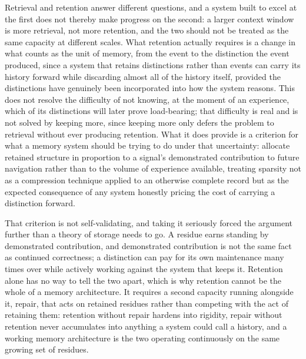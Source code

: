 \documentclass[11pt]{amsart}
\theoremstyle{plain}
\theoremstyle{definition}
\theoremstyle{remark}
\begin{document}
Retrieval and retention answer different questions, and a system built
to excel at the first does not thereby make progress on the second: a
larger context window is more retrieval, not more retention, and the
two should not be treated as the same capacity at different scales.
What retention actually requires is a change in what counts as the
unit of memory, from the event to the distinction the event produced,
since a system that retains distinctions rather than events can carry
its history forward while discarding almost all of the history itself,
provided the distinctions have genuinely been incorporated into how the
system reasons. This does not resolve the difficulty of not knowing, at
the moment of an experience, which of its distinctions will later prove
load-bearing; that difficulty is real and is not solved by keeping
more, since keeping more only defers the problem to retrieval without
ever producing retention. What it does provide is a criterion for what
a memory system should be trying to do under that uncertainty: allocate
retained structure in proportion to a signal's demonstrated
contribution to future navigation rather than to the volume of
experience available, treating sparsity not as a compression technique
applied to an otherwise complete record but as the expected consequence
of any system honestly pricing the cost of carrying a distinction
forward.

That criterion is not self-validating, and taking it seriously forced
the argument further than a theory of storage needs to go. A residue
earns standing by demonstrated contribution, and demonstrated
contribution is not the same fact as continued correctness; a
distinction can pay for its own maintenance many times over while
actively working against the system that keeps it. Retention alone has
no way to tell the two apart, which is why retention cannot be the
whole of a memory architecture. It requires a second capacity running
alongside it, repair, that acts on retained residues rather than
competing with the act of retaining them: retention without repair
hardens into rigidity, repair without retention never accumulates into
anything a system could call a history, and a working memory
architecture is the two operating continuously on the same growing set
of residues.
\end{document}
